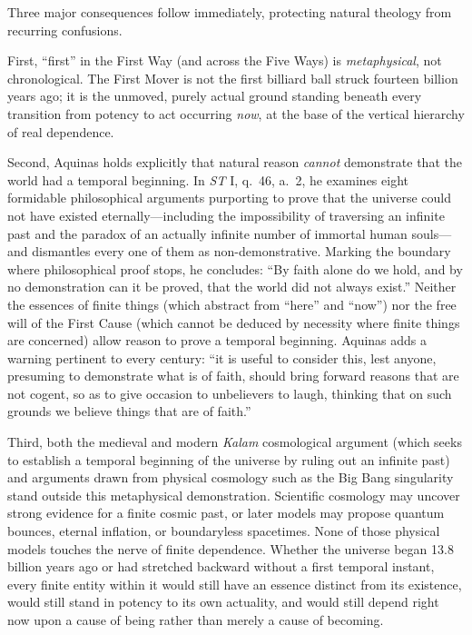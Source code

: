 Three major consequences follow immediately, protecting natural theology from recurring confusions.

First, ``first'' in the First Way (and across the Five Ways) is \emph{metaphysical}, not chronological. The First Mover is not the first billiard ball struck fourteen billion years ago; it is the unmoved, purely actual ground standing beneath every transition from potency to act occurring \emph{now}, at the base of the vertical hierarchy of real dependence.

Second, Aquinas holds explicitly that natural reason \emph{cannot} demonstrate that the world had a temporal beginning. In \emph{ST} I, q.\ 46, a.\ 2, he examines eight formidable philosophical arguments purporting to prove that the universe could not have existed eternally---including the impossibility of traversing an infinite past and the paradox of an actually infinite number of immortal human souls---and dismantles every one of them as non-demonstrative. Marking the boundary where philosophical proof stops, he concludes: ``By faith alone do we hold, and by no demonstration can it be proved, that the world did not always exist.'' Neither the essences of finite things (which abstract from ``here'' and ``now'') nor the free will of the First Cause (which cannot be deduced by necessity where finite things are concerned) allow reason to prove a temporal beginning. Aquinas adds a warning pertinent to every century: ``it is useful to consider this, lest anyone, presuming to demonstrate what is of faith, should bring forward reasons that are not cogent, so as to give occasion to unbelievers to laugh, thinking that on such grounds we believe things that are of faith.''

Third, both the medieval and modern \emph{Kalam} cosmological argument (which seeks to establish a temporal beginning of the universe by ruling out an infinite past) and arguments drawn from physical cosmology such as the Big Bang singularity stand outside this metaphysical demonstration. Scientific cosmology may uncover strong evidence for a finite cosmic past, or later models may propose quantum bounces, eternal inflation, or boundaryless spacetimes. None of those physical models touches the nerve of finite dependence. Whether the universe began 13.8 billion years ago or had stretched backward without a first temporal instant, every finite entity within it would still have an essence distinct from its existence, would still stand in potency to its own actuality, and would still depend right now upon a cause of being rather than merely a cause of becoming.
